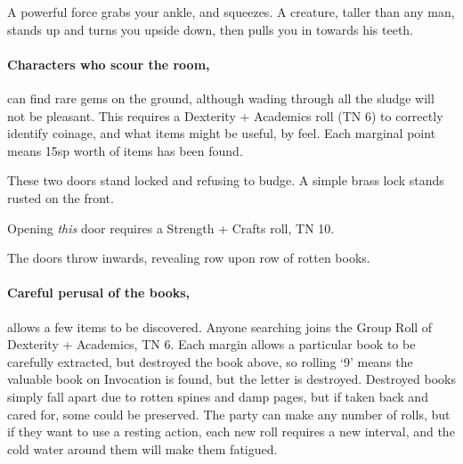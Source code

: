 \begin{multicols}{2}
\begin{boxtext}
\end{boxtext}

\begin{boxtext}

  A powerful force grabs your ankle, and squeezes.
  A creature, taller than any man, stands up and turns you upside down, then pulls you in towards his teeth.

\end{boxtext}


\paragraph{Characters who scour the room,}
can find rare gems on the ground, although wading through all the sludge will not be pleasant.
This requires a Dexterity + Academics roll (TN 6) to correctly identify coinage, and what items might be useful, by feel.
Each marginal point means 15sp worth of items has been found.


\begin{boxtext}

  These two doors stand locked and refusing to budge.  A simple brass lock stands rusted on the front.

\end{boxtext}

Opening \emph{this} door requires a Strength + Crafts roll, TN 10.

\begin{boxtext}
  The doors throw inwards, revealing row upon row of rotten books.
\end{boxtext}

\paragraph{Careful perusal of the books,}
allows a few items to be discovered.
Anyone searching joins the Group Roll of Dexterity + Academics, TN 6.
Each margin allows a particular book to be carefully extracted, but destroyed the book above, so rolling `9' means the valuable book on Invocation is found, but the letter is destroyed.
Destroyed books simply fall apart due to rotten spines and damp pages, but if taken back and cared for, some could be preserved.
The party can make any number of rolls, but if they want to use a resting action, each new roll requires a new \gls{interval}, and the cold water around them will make them fatigued.


\end{multicols}
